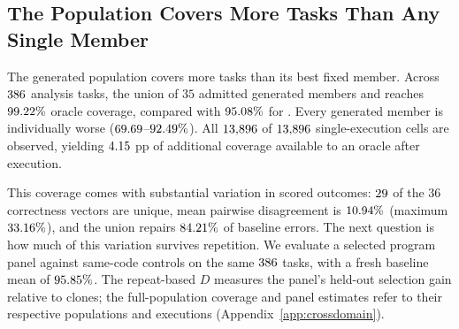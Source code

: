 \subsection{The Population Covers More Tasks Than Any Single Member}
\label{sec:f2-headroom}
The generated population covers more tasks than its best fixed member.
Across $386$ analysis tasks, the union of $35$ admitted
generated members and \bare{} reaches $99.22\%$ oracle
coverage, compared with $95.08\%$ for \bare{}.
Every generated member is individually worse
($69.69$--$92.49\%$). All $13{,}896$ of
$13{,}896$ single-execution cells are observed, yielding
$4.15$ pp of additional coverage available to an
oracle after execution.

This coverage comes with substantial variation in scored outcomes:
$29$ of the $36$ correctness vectors are unique, mean
pairwise disagreement is $10.94\%$
(maximum $33.16\%$), and the union repairs
$84.21\%$ of baseline errors. The next question is how
much of this variation survives repetition. We evaluate a selected
program panel against same-code controls on the same $386$
tasks, with a fresh baseline mean of $95.85\%$.
The repeat-based $D$ measures the panel's held-out selection gain
relative to clones; the full-population coverage and panel estimates
refer to their respective populations and executions
(Appendix~\ref{app:crossdomain}).
